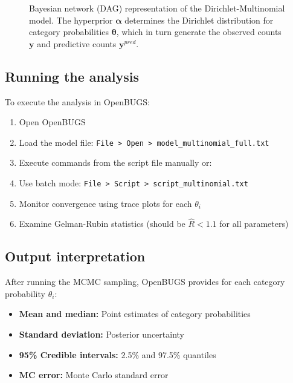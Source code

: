 \begin{figure}[htpb]
{
}
\caption{Bayesian network (DAG) representation of the Dirichlet-Multinomial model. The hyperprior $\boldsymbol{\alpha}$ determines the Dirichlet distribution for category probabilities $\boldsymbol{\theta}$, which in turn generate the observed counts $\mathbf{y}$ and predictive counts $\mathbf{y}^{pred}$.}
\label{fig:dag_multinomial}
\end{figure}

\subsection{Running the analysis}

To execute the analysis in OpenBUGS:
\begin{enumerate}
    \item Open OpenBUGS
    \item Load the model file: \texttt{File > Open > model\_multinomial\_full.txt}
    \item Execute commands from the script file manually or:
    \item Use batch mode: \texttt{File > Script > script\_multinomial.txt}
    \item Monitor convergence using trace plots for each $\theta_i$
    \item Examine Gelman-Rubin statistics (should be $\hat{R} < 1.1$ for all parameters)
\end{enumerate}

\subsection{Output interpretation}

After running the MCMC sampling, OpenBUGS provides for each category probability $\theta_i$:
\begin{itemize}
    \item \textbf{Mean and median:} Point estimates of category probabilities
    \item \textbf{Standard deviation:} Posterior uncertainty
    \item \textbf{95\% Credible intervals:} 2.5\% and 97.5\% quantiles
    \item \textbf{MC error:} Monte Carlo standard error
\end{itemize}

